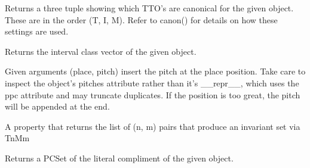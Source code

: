 \documentclass[letterpaper,10pt,english]{sphinxmanual}
\begin{document}
\begin{fulllineitems}
\begin{fulllineitems}
\begin{quote}
\begin{description}
\end{description}
\end{quote}

\end{fulllineitems}


\begin{fulllineitems}
\label{_templates/core:core.PPCSetBase.get_canon}
Returns a three tuple showing which TTO's are canonical for the given
object. These are in the order (T, I, M). Refer to canon() for details
on how these settings are used.

\end{fulllineitems}


\begin{fulllineitems}
\label{_templates/core:core.PPCSetBase.icv}
Returns the interval class vector of the given object.

\end{fulllineitems}


\begin{fulllineitems}
\label{_templates/core:core.PPCSetBase.insert}
Given arguments (place, pitch) insert the pitch at the place position.
Take care to inspect the object's pitches attribute rather than it's
\_\_repr\_\_, which uses the ppc attribute and may truncate duplicates.
If the position is too great, the pitch will be appended at the end.

\end{fulllineitems}


\begin{fulllineitems}
\label{_templates/core:core.PPCSetBase.invariance_vector}
A property that returns the list of (n, m) pairs that produce an
invariant set via TnMm

\end{fulllineitems}


\begin{fulllineitems}
\label{_templates/core:core.PPCSetBase.literal_compliment}
Returns a PCSet of the literal compliment of the given object.


\end{fulllineitems}
\end{fulllineitems}
\end{document}
